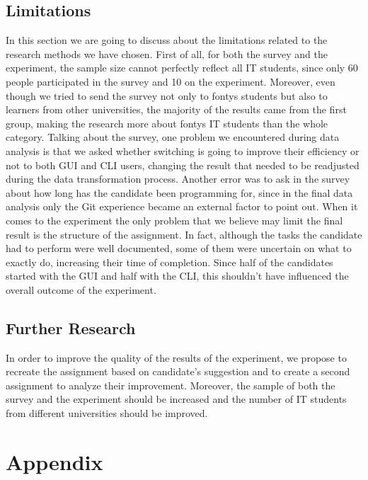 \documentclass[]{report}
\begin{document}
	\subsection{Limitations}
	In this section we are going to discuss about the limitations related to the research methods we have chosen.
	First of all, for both the survey and the experiment, the sample size cannot perfectly reflect all IT students, since only 60 people participated in the survey and 10 on the experiment.
	Moreover, even though we tried to send the survey not only to fontys students but also to learners from other universities, the majority of the results came from the first group, making the research more about fontys IT students than the whole category.
	Talking about the survey, one problem we encountered during data analysis is that we asked whether switching is going to improve their efficiency or not to both GUI and CLI users, changing the result that needed to be readjusted during the data transformation process. Another error was to ask in the survey about how long has the candidate been programming for, since in the final data analysis only the Git experience became an external factor to point out.
	When it comes to the experiment the only problem that we believe may limit the final result is the structure of the assignment. In fact, although the tasks the candidate had to perform were well documented, some of them were uncertain on what to exactly do, increasing their time of completion. Since half of the candidates started with the GUI and half with the CLI, this shouldn't have influenced the overall outcome of the experiment.
	\subsection{Further Research}
	In order to improve the quality of the results of the experiment, we propose to recreate the assignment based on candidate's suggestion and to create a second assignment to analyze their improvement. Moreover, the sample of both the survey and the experiment should be increased and the number of IT students from different universities should be improved. \newpage
	\section{Appendix}
\end{document}
